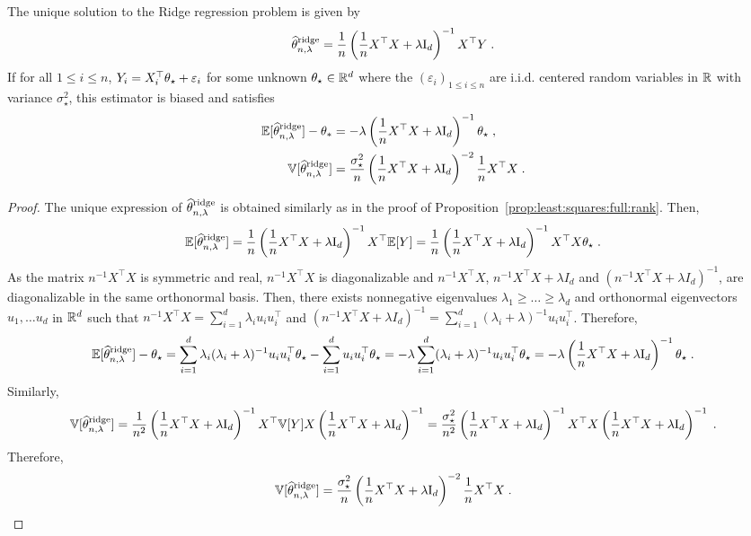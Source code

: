 \begin{shaded}
\begin{proposition}
\label{prop:least:squares:ridge}
The unique solution to the Ridge regression problem is given by
\[
\widehat {\theta}^{\mathrm{ridge}}_{n,\lambda} = \frac{1}{n}\left(\frac{1}{n}X^\top X + \lambda \mathrm{I}_d\right)^{-1}X^\top Y\;.
\] 
If for all $1\leqslant i \leqslant n$, $Y_i = X^\top_i \theta_{\star} + \varepsilon_i$ for some unknown $\theta_\star\in\mathbb{R}^d$ where the $(\varepsilon_i)_{1\leqslant i\leqslant n}$ are i.i.d. centered random variables in $\mathbb{R}$ with variance $\sigma_\star^2$, this estimator is biased and satisfies 
\begin{align*}
\mathbb{E}[\widehat {\theta}^{\mathrm{ridge}}_{n,\lambda} ] - \theta_*&= - \lambda\left(\frac{1}{n}X^\top X + \lambda \mathrm{I}_d\right)^{-1}\theta_\star\;,\\
\mathbb{V}[\widehat {\theta}^{\mathrm{ridge}}_{n,\lambda} ] &= \frac{\sigma_\star^{2}}{n}\left(\frac{1}{n}X^\top X + \lambda \mathrm{I}_d\right)^{-2}\frac{1}{n}X^\top X\;.
\end{align*}
\end{proposition}
\end{shaded}
\begin{proof}
The unique expression of $\widehat {\theta}^{\mathrm{ridge}}_{n,\lambda} $ is obtained similarly as in the proof of Proposition~\ref{prop:least:squares:full:rank}. Then,
$$
\mathbb{E}[\widehat {\theta}^{\mathrm{ridge}}_{n,\lambda}] =  \frac{1}{n}\left (\frac{1}{n}X^\top X + \lambda  \mathrm{I}_d \right)^{-1}X^\top \mathbb{E}[Y] =  \frac{1}{n}\left(\frac{1}{n} X^\top X + \lambda  \mathrm{I}_d\right )^{-1}X^\top X\theta_\star \;.
$$
As the matrix $n^{-1}X^\top X$ is symmetric and real,  $ n^{-1}X^\top X$ is diagonalizable and $n^{-1}X^\top X$, $n^{-1}X^\top X + \lambda I_d$ and $(n^{-1} X^\top X + \lambda I_d)^{-1}$, are diagonalizable in the same orthonormal basis. Then, there exists nonnegative eigenvalues $\lambda_1\geqslant \ldots \geqslant \lambda_d$ and orthonormal eigenvectors $u_1, \ldots u_d$ in $\mathbb{R}^d$ such that $n^{-1} X^\top X = \sum_{i=1}^d \lambda_i u_i u_i^\top$ and $(n^{-1}X^\top X + \lambda I_d)^{-1} = \sum_{i=1}^d (\lambda_i + \lambda)^{-1}u_i u_i^\top$. Therefore, 
$$
\mathbb{E}[\widehat {\theta}^{\mathrm{ridge}}_{n,\lambda}] -\theta_\star=  \sum_{i=1}^d \lambda_i(\lambda_i + \lambda)^{-1}u_i u_i^\top\theta_\star -  \sum_{i=1}^d u_i u_i^\top\theta_\star =  - \lambda  \sum_{i=1}^d (\lambda_i + \lambda)^{-1}u_i u_i^\top\theta_\star = - \lambda\left(\frac{1}{n}X^\top X + \lambda \mathrm{I}_d\right)^{-1}\theta_\star\;.
$$
Similarly,
$$
\mathbb{V}[\widehat {\theta}^{\mathrm{ridge}}_{n,\lambda}]  =  \frac{1}{n^2}\left(\frac{1}{n}X^\top X + \lambda \mathrm{I}_d\right)^{-1}X^\top \mathbb{V}[Y]X  \left(\frac{1}{n}X^\top X + \lambda \mathrm{I}_d\right)^{-1} = \frac{\sigma_\star^{2}}{n^2}\left(\frac{1}{n}X^\top X + \lambda \mathrm{I}_d\right)^{-1}X^\top X  \left(\frac{1}{n}X^\top X + \lambda \mathrm{I}_d\right)^{-1}\;.
$$
Therefore,
$$
\mathbb{V}[\widehat {\theta}^{\mathrm{ridge}}_{n,\lambda}]  =   \frac{\sigma_\star^{2}}{n}\left(\frac{1}{n}X^\top X + \lambda \mathrm{I}_d\right)^{-2}\frac{1}{n}X^\top X\;.
$$
\end{proof}
